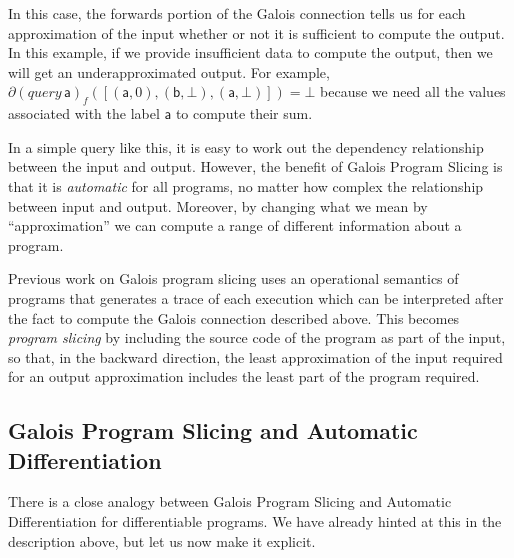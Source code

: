 \begin{example}
  In this case, the forwards portion of the Galois connection tells us for each approximation of the input whether or not it is sufficient to compute the output. In this example, if we provide insufficient data to compute the output, then we will get an underapproximated output. For example, $\partial (\mathit{query}\, \mathsf{a})_f([(\mathsf{a},0),(\mathsf{b},\bot),(\mathsf{a},\bot)]) = \bot$ because we need all the values associated with the label $\mathsf{a}$ to compute their sum.

  In a simple query like this, it is easy to work out the dependency relationship between the input and output. However, the benefit of Galois Program Slicing is that it is {\em automatic} for all programs, no matter how complex the relationship between input and output. Moreover, by changing what we mean by ``approximation'' we can compute a range of different information about a program.
\end{example}

Previous work on Galois program slicing uses an operational semantics of programs that generates a trace of each execution which can be interpreted after the fact to compute the Galois connection described above. This becomes {\em program slicing} by including the source code of the program as part of the input, so that, in the backward direction, the least approximation of the input required for an output approximation includes the least part of the program required.



\subsection{Galois Program Slicing and Automatic Differentiation}

There is a close analogy between Galois Program Slicing and Automatic Differentiation for differentiable programs. We have already hinted at this in the description above, but let us now make it explicit.


